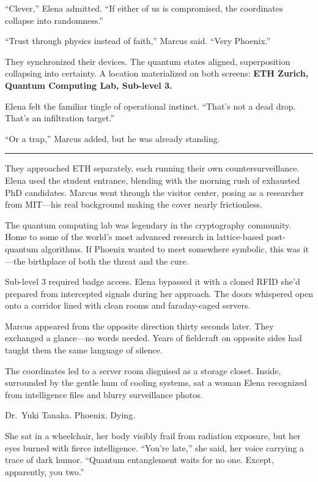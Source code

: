 ``Clever,'' Elena admitted. ``If either of us is compromised, the
coordinates collapse into randomness.''

``Trust through physics instead of faith,'' Marcus said. ``Very
Phoenix.''

They synchronized their devices. The quantum states aligned,
superposition collapsing into certainty. A location materialized on both
screens: \textbf{ETH Zurich, Quantum Computing Lab, Sub-level 3.}

Elena felt the familiar tingle of operational instinct. ``That's not a
dead drop. That's an infiltration target.''

``Or a trap,'' Marcus added, but he was already standing.

\begin{center}\rule{0.5\linewidth}{0.5pt}\end{center}

They approached ETH separately, each running their own
countersurveillance. Elena used the student entrance, blending with the
morning rush of exhausted PhD candidates. Marcus went through the
visitor center, posing as a researcher from MIT---his real background
making the cover nearly frictionless.

The quantum computing lab was legendary in the cryptography community.
Home to some of the world's most advanced research in lattice-based
post-quantum algorithms. If Phoenix wanted to meet somewhere symbolic,
this was it---the birthplace of both the threat and the cure.

Sub-level 3 required badge access. Elena bypassed it with a cloned RFID
she'd prepared from intercepted signals during her approach. The doors
whispered open onto a corridor lined with clean rooms and faraday-caged
servers.

Marcus appeared from the opposite direction thirty seconds later. They
exchanged a glance---no words needed. Years of fieldcraft on opposite
sides had taught them the same language of silence.

The coordinates led to a server room disguised as a storage closet.
Inside, surrounded by the gentle hum of cooling systems, sat a woman
Elena recognized from intelligence files and blurry surveillance photos.

Dr.~Yuki Tanaka. Phoenix. Dying.

She sat in a wheelchair, her body visibly frail from radiation exposure,
but her eyes burned with fierce intelligence. ``You're late,'' she said,
her voice carrying a trace of dark humor. ``Quantum entanglement waits
for no one. Except, apparently, you two.''


